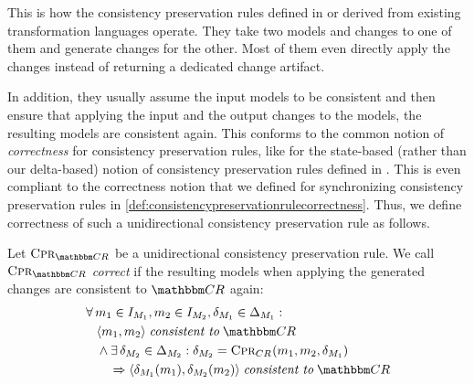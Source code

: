 This is how the consistency preservation rules defined in or derived from existing transformation languages operate.
They take two models and changes to one of them and generate changes for the other.
Most of them even directly apply the changes instead of returning a dedicated change artifact.

In addition, they usually assume the input models to be consistent and then ensure that applying the input and the output changes to the models, the resulting models are consistent again.
This conforms to the common notion of \emph{correctness} for consistency preservation rules, like for the state-based (rather than our delta-based) notion of consistency preservation rules defined in \cite{stevens2010sosym}.
This is even compliant to the correctness notion that we defined for synchronizing consistency preservation rules in \autoref{def:consistencypreservationrulecorrectness}.
Thus, we define correctness of such a unidirectional consistency preservation rule as follows.

\begin{definition}
    \label{def:unidirectionalconsistencypreservationrulecorrectness}
    Let $\consistencypreservationrule{\consistencyrelationset{CR}}$ be a unidirectional consistency preservation rule.
    We call $\consistencypreservationrule{\consistencyrelationset{CR}}$ \emph{correct} if the resulting models when applying the generated changes are consistent to $\consistencyrelationset{CR}$ again:
    \begin{align*}
        &
        \forall 
        \model{m}{1} \in \metamodelinstanceset{M}{1}, 
        \model{m}{2} \in \metamodelinstanceset{M}{2},
        \change{\metamodel{M}{1}} \in \changeuniverse{\metamodel{M}{1}} : \\
        & \formulaskip
        \tupled{\model{m}{1}, \model{m}{2}} \consistenttomath \consistencyrelationset{CR} \\
        & \formulaskip
        \land \exists 
        \change{\metamodel{M}{2}} \in \changeuniverse{\metamodel{M}{2}} :
        \change{\metamodel{M}{2}} = \consistencypreservationrule{\consistencyrelation{CR}{}}(\model{m}{1}, \model{m}{2}, \change{\metamodel{M}{1}}) \\
        & \formulaskip\formulaskip
        \Rightarrow
        \tupled{\change{\metamodel{M}{1}}(\model{m}{1}), \change{\metamodel{M}{2}}(\model{m}{2})} \consistenttomath \consistencyrelationset{CR}
    \end{align*}
\end{definition}

